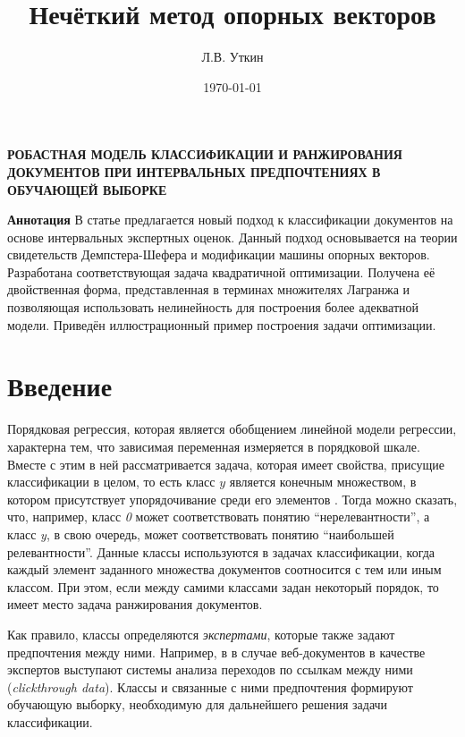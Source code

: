 \documentclass[12pt,a4paper,oneside]{article}
\title{Нечёткий метод опорных векторов}
\author{Л.В. Уткин}
\date{\today}
\begin{document}

\ApplyCommonPageStyle


\begin{center}
\textbf{\large РОБАСТНАЯ МОДЕЛЬ КЛАССИФИКАЦИИ И РАНЖИРОВАНИЯ ДОКУМЕНТОВ ПРИ ИНТЕРВАЛЬНЫХ ПРЕДПОЧТЕНИЯХ В ОБУЧАЮЩЕЙ ВЫБОРКЕ}
\end{center}
\vspace{2em}
{\footnotesize %
\textbf{Аннотация} В статье предлагается новый подход к классификации документов на основе интервальных экспертных оценок. 
Данный подход основывается на теории свидетельств Демпстера-Шефера и модификации машины опорных векторов. 
Разработана соответствующая задача квадратичной оптимизации. 
Получена её двойственная форма, представленная в терминах множителях Лагранжа и позволяющая использовать нелинейность для построения более адекватной модели. 
Приведён иллюстрационный пример построения задачи оптимизации. 
%
}


\section{Введение}
\label{sec:introduction}

\par
Порядковая регрессия, которая является обобщением линейной модели регрессии, характерна тем, что зависимая переменная измеряется в порядковой шкале. 
Вместе с этим в ней рассматривается задача, которая имеет свойства, присущие классификации в целом, то есть класс $y$ является конечным множеством, в котором присутствует упорядочивание среди его элементов .
Тогда можно сказать, что, например, класс \emph{0} может соответствовать понятию ``нерелевантности'', а класс \emph{y}, в свою очередь, может соответствовать понятию ``наибольшей релевантности''. 
Данные классы используются в задачах классификации, когда каждый элемент заданного множества документов соотносится с тем или иным классом. 
При этом, если между самими классами задан некоторый порядок, то имеет место задача ранжирования документов. 

\par
Как правило, классы определяются \emph{экспертами}, которые также задают предпочтения между ними. 
Например, в в случае веб-документов в качестве экспертов выступают системы анализа переходов по ссылкам между ними (\emph{clickthrough data}). 
Классы и связанные с ними предпочтения формируют обучающую выборку, необходимую для дальнейшего решения задачи классификации. 
\end{document}

